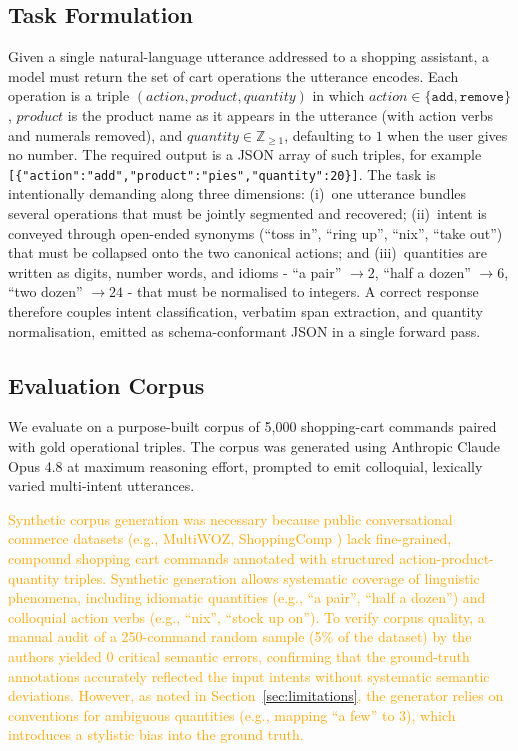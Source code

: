 \documentclass[journal,article,submit,pdftex,moreauthors]{Definitions/mdpi}
\begin{document}
\subsection{Task Formulation}\label{sec:task}

Given a single natural-language utterance addressed to a shopping assistant, a model must return the set of cart operations the utterance encodes. Each operation is a triple $(action,product,quantity)$ in which $action\in\{\texttt{add},\texttt{remove}\}$, $product$ is the product name as it appears in the utterance (with action verbs and numerals removed), and $quantity\in\mathbb{Z}_{\ge 1}$, defaulting to $1$ when the user gives no number. The required output is a JSON array of such triples, for example \texttt{[\{"action":"add","product":"pies","quantity":20\}]}. The task is intentionally demanding along three dimensions: (i)~one utterance bundles several operations that must be jointly segmented and recovered; (ii)~intent is conveyed through open-ended synonyms (``toss in'', ``ring up'', ``nix'', ``take out'') that must be collapsed onto the two canonical actions; and (iii)~quantities are written as digits, number words, and idioms - ``a pair'' $\rightarrow 2$, ``half a dozen'' $\rightarrow 6$, ``two dozen'' $\rightarrow 24$ - that must be normalised to integers. A correct response therefore couples intent classification, verbatim span extraction, and quantity normalisation, emitted as schema-conformant JSON in a single forward pass.

\subsection{Evaluation Corpus}\label{sec:data}

We evaluate on a purpose-built corpus of 5,000 shopping-cart commands paired with gold operational triples. The corpus was generated using Anthropic Claude Opus 4.8 at maximum reasoning effort, prompted to emit colloquial, lexically varied multi-intent utterances. 

\textcolor{orange}{Synthetic corpus generation was necessary because public conversational commerce datasets (e.g., MultiWOZ, ShoppingComp \cite{tou2025shoppingcomp}) lack fine-grained, compound shopping cart commands annotated with structured action-product-quantity triples. Synthetic generation allows systematic coverage of linguistic phenomena, including idiomatic quantities (e.g., ``a pair'', ``half a dozen'') and colloquial action verbs (e.g., ``nix'', ``stock up on''). To verify corpus quality, a manual audit of a 250-command random sample (5\% of the dataset) by the authors yielded 0 critical semantic errors, confirming that the ground-truth annotations accurately reflected the input intents without systematic semantic deviations. However, as noted in Section~\ref{sec:limitations}, the generator relies on conventions for ambiguous quantities (e.g., mapping ``a few'' to 3), which introduces a stylistic bias into the ground truth.}
\end{document}
